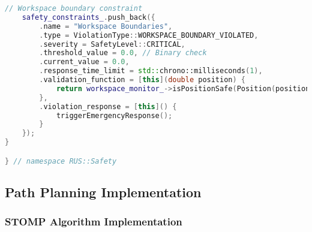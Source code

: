 \begin{lstlisting}[language=C++, caption={Safety Manager Core Implementation}, label={lst:app-safety-manager}]
    // Workspace boundary constraint
    safety_constraints_.push_back({
        .name = "Workspace Boundaries",
        .type = ViolationType::WORKSPACE_BOUNDARY_VIOLATED,
        .severity = SafetyLevel::CRITICAL,
        .threshold_value = 0.0, // Binary check
        .current_value = 0.0,
        .response_time_limit = std::chrono::milliseconds(1),
        .validation_function = [this](double position) { 
            return workspace_monitor_->isPositionSafe(Position(position)); 
        },
        .violation_response = [this]() { 
            triggerEmergencyResponse(); 
        }
    });
}

} // namespace RUS::Safety
\end{lstlisting}

\subsection{Path Planning Implementation}

\subsubsection{STOMP Algorithm Implementation}

